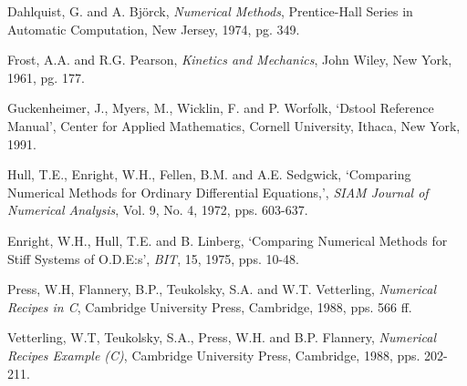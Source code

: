 \begin{thebibliography}{99}

 Dahlquist, G. and A. Bj\"orck,  {\em Numerical Methods},
Prentice-Hall Series in Automatic Computation, New Jersey, 1974, pg. 349.

 Frost, A.A. and R.G. Pearson, {\em Kinetics and Mechanics},
John Wiley, New York, 1961, pg. 177.

 Guckenheimer, J., Myers, M., Wicklin, F. and P. Worfolk, 
`Dstool Reference Manual', Center for Applied Mathematics, Cornell University,
Ithaca, New York, 1991.

  Hull, T.E., Enright, W.H., Fellen, B.M. and A.E. Sedgwick, 
`Comparing Numerical Methods for Ordinary Differential Equations,', 
{\em SIAM Journal of Numerical Analysis}, Vol. 9, No. 4, 1972, pps. 603-637.

 Enright, W.H., Hull, T.E. and B. Linberg, `Comparing Numerical
Methods for Stiff Systems of O.D.E:s', {\em BIT}, 15, 1975, pps. 10-48.

 Press, W.H, Flannery, B.P., Teukolsky, S.A. and W.T. Vetterling,
{\em Numerical Recipes in C}, Cambridge University Press, Cambridge, 1988, 
pps. 566 ff.

 Vetterling, W.T, Teukolsky, S.A., Press, W.H. and B.P. Flannery, 
{\em Numerical Recipes Example (C)}, Cambridge University Press, Cambridge,
1988, pps. 202-211.

\end{thebibliography}
 
